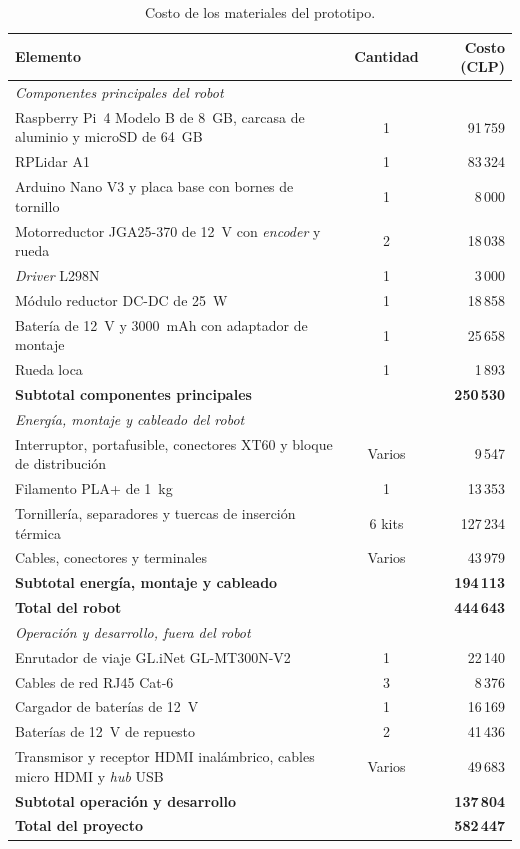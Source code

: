 \begin{appendices}
\begin{table}[H]
\centering
\caption{Costo de los materiales del prototipo.}
\label{tab:anx_costos}
\small
\begin{tabular}{p{9.2cm} c r}
\toprule
\textbf{Elemento} & \textbf{Cantidad} & \textbf{Costo (CLP)} \\
\midrule
\multicolumn{3}{l}{\textit{Componentes principales del robot}} \\
Raspberry Pi~4 Modelo B de 8~GB, carcasa de aluminio y microSD de 64~GB & 1 & 91\,759 \\
RPLidar A1 & 1 & 83\,324 \\
\gls{Arduino} Nano V3 y placa base con bornes de tornillo & 1 & 8\,000 \\
Motorreductor JGA25-370 de 12~V con \textit{encoder} y rueda & 2 & 18\,038 \\
\textit{Driver} L298N & 1 & 3\,000 \\
Módulo reductor DC-DC de 25~W & 1 & 18\,858 \\
Batería de 12~V y 3000~mAh con adaptador de montaje & 1 & 25\,658 \\
Rueda loca & 1 & 1\,893 \\
\textbf{Subtotal componentes principales} & & \textbf{250\,530} \\
\midrule
\multicolumn{3}{l}{\textit{Energía, montaje y cableado del robot}} \\
Interruptor, portafusible, conectores XT60 y bloque de distribución & Varios & 9\,547 \\
Filamento PLA+ de 1~kg & 1 & 13\,353 \\
Tornillería, separadores y tuercas de inserción térmica & 6 kits & 127\,234 \\
Cables, conectores y terminales & Varios & 43\,979 \\
\textbf{Subtotal energía, montaje y cableado} & & \textbf{194\,113} \\
\midrule
\textbf{Total del robot} & & \textbf{444\,643} \\
\midrule
\multicolumn{3}{l}{\textit{Operación y desarrollo, fuera del robot}} \\
Enrutador de viaje GL.iNet GL-MT300N-V2 & 1 & 22\,140 \\
Cables de red RJ45 Cat-6 & 3 & 8\,376 \\
Cargador de baterías de 12~V & 1 & 16\,169 \\
Baterías de 12~V de repuesto & 2 & 41\,436 \\
Transmisor y receptor HDMI inalámbrico, cables micro HDMI y \textit{hub} USB & Varios & 49\,683 \\
\textbf{Subtotal operación y desarrollo} & & \textbf{137\,804} \\
\midrule
\textbf{Total del proyecto} & & \textbf{582\,447} \\
\bottomrule
\end{tabular}
\end{table}


\end{appendices}
